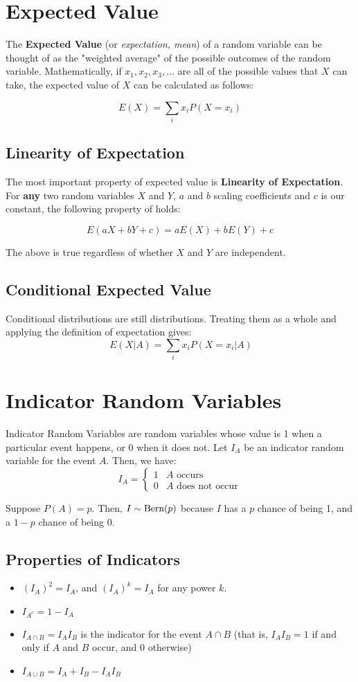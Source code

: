 \documentclass[11pt]{article}
\begin{document}
\begin{notes}
\section*{Expected Value} 
The \textbf{Expected Value} (or \textit{expectation, mean}) of a random variable can be thought of as the "weighted average" of the possible outcomes of the random variable. Mathematically, if $x_1, x_2, x_3, \dots$ are all of the possible values that $X$ can take, the expected value of $X$ can be calculated as follows:

$$E(X) = \sum\limits_{i}x_iP(X=x_i)$$

\subsection*{Linearity of Expectation}
The most important property of expected value is \textbf{Linearity of Expectation}. For \textbf{any} two random variables $X$ and $Y$, $a$ and $b$ scaling coefficients and $c$ is our constant, the following property of holds:

\[E(aX + bY + c) = aE(X) + bE(Y) + c \]

The above is true regardless of whether $X$ and $Y$ are independent. 


\subsection*{Conditional Expected Value} 
Conditional distributions are still distributions. Treating them as a whole and applying the definition of expectation gives: 
$$\ E(X | A) = \sum\limits_{i}x_iP(X=x_i | A)$$

\section*{Indicator Random Variables} 

Indicator Random Variables are random variables whose value is 1 when a particular event happens, or 0 when it does not. Let $I_A$ be an indicator random variable for the event $A$. Then, we have: 
\[
I_A =
 \begin{cases}
   1 & \text{$A$ occurs} \\
   0 & \text{$A$ does not occur}
  \end{cases}
\]

Suppose $P(A) = p$. Then, $I \sim \textrm{Bern}(p)$ because $I$ has a $p$ chance of being 1, and a $1-p$ chance of being 0. 

\subsection*{Properties of Indicators}
\begin{itemize}
\item $(I_A)^2 = I_A$, and $(I_A)^k = I_A$ for any power $k$.
\item $I_{A^c} = 1 - I_A$
\item $I_{A \cap B} = I_A I_B$ is the indicator for the event $A \cap B$ (that is, $I_A I_B = 1$ if and only if $A$ and $B$ occur, and 0 otherwise)
\item $I_{A \cup B} = I_A + I_B - I_A I_B$
\end{itemize}


\end{notes}
\end{document}
